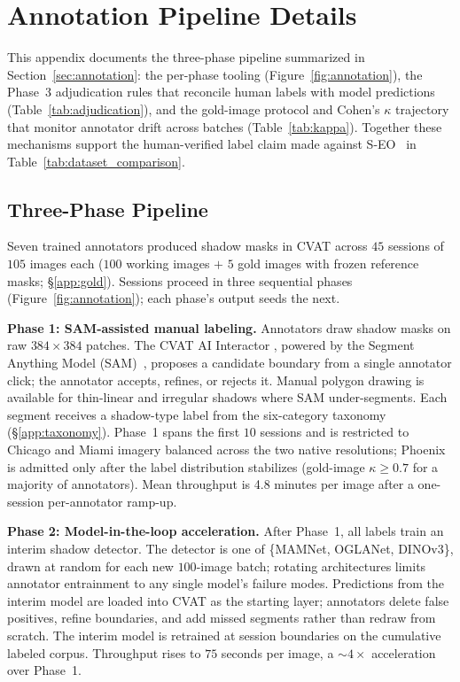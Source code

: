 
\section{Annotation Pipeline Details}
\label{app:annotation}



This appendix documents the three-phase pipeline summarized in
Section~\ref{sec:annotation}: the per-phase tooling
(Figure~\ref{fig:annotation}), the Phase~3 adjudication rules that
reconcile human labels with model predictions
(Table~\ref{tab:adjudication}), and the gold-image protocol and
Cohen's $\kappa$ trajectory that monitor annotator drift across batches
(Table~\ref{tab:kappa}). Together these mechanisms support the
human-verified label claim made against S-EO~\cite{seo} in
Table~\ref{tab:dataset_comparison}.

\subsection{Three-Phase Pipeline}
\label{app:phases}

Seven trained annotators produced shadow masks in CVAT across
$45$ sessions of $105$ images each ($100$ working images $+$ $5$
gold images with frozen reference masks; \S\ref{app:gold}). Sessions
proceed in three sequential phases (Figure~\ref{fig:annotation}); each
phase's output seeds the next.

\textbf{Phase 1: SAM-assisted manual labeling.} Annotators draw shadow
masks on raw $384{\times}384$ patches. The CVAT AI Interactor \cite{cvat}, powered
by the Segment Anything Model (SAM)~\cite{sam}, proposes a
candidate boundary from a single annotator click; the annotator
accepts, refines, or rejects it. Manual polygon drawing is available
for thin-linear and irregular shadows where SAM under-segments. Each
segment receives a shadow-type label from the six-category taxonomy
(\S\ref{app:taxonomy}). Phase~1 spans the first $10$ sessions and
is restricted to Chicago and Miami imagery balanced across the two
native resolutions; Phoenix is admitted only after the label
distribution stabilizes (gold-image $\kappa \geq 0.7$ for a
majority of annotators). Mean throughput is 4.8 minutes per
image after a one-session per-annotator ramp-up.

\textbf{Phase 2: Model-in-the-loop acceleration.} After Phase~1, all
labels train an interim shadow detector. The detector is one of
\{MAMNet, OGLANet, DINOv3\}, drawn at random for each new $100$-image
batch; rotating architectures limits annotator entrainment to any
single model's failure modes. Predictions from the interim model are
loaded into CVAT as the starting layer; annotators delete false
positives, refine boundaries, and add missed segments rather than
redraw from scratch. The interim model is retrained at session
boundaries on the cumulative labeled corpus. Throughput rises to
$75$ seconds per image, a $\sim\!4\times$ acceleration over
Phase~1.

